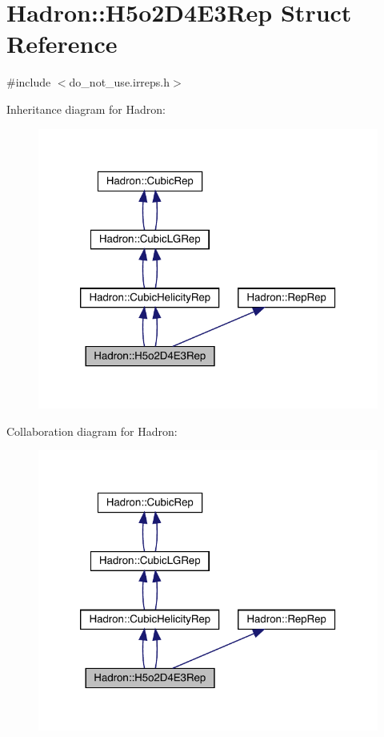 \hypertarget{structHadron_1_1H5o2D4E3Rep}{}\section{Hadron\+:\+:H5o2\+D4\+E3\+Rep Struct Reference}
\label{structHadron_1_1H5o2D4E3Rep}


{\ttfamily \#include $<$do\+\_\+not\+\_\+use.\+irreps.\+h$>$}



Inheritance diagram for Hadron\+:\nopagebreak
\begin{figure}[H]
\begin{center}
\leavevmode
\includegraphics[width=320pt]{d9/d1e/structHadron_1_1H5o2D4E3Rep__inherit__graph}
\end{center}
\end{figure}


Collaboration diagram for Hadron\+:\nopagebreak
\begin{figure}[H]
\begin{center}
\leavevmode
\includegraphics[width=320pt]{df/dea/structHadron_1_1H5o2D4E3Rep__coll__graph}
\end{center}
\end{figure}
